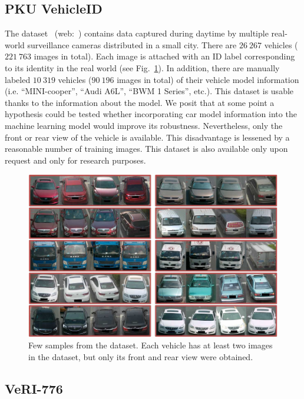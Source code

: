 \subsection{PKU VehicleID}
\label{ssec:DatasetPKUVehicleID}

The  dataset~\cite{liu2016deepreldist} (web:~\cite{webpkuvehicledataset}) contains data captured during daytime by multiple real-world surveillance cameras distributed in a small city. There are $26\ 267$ vehicles ($221\ 763$ images in total). Each image is attached with an ID label corresponding to its identity in the real world (see Fig.~\ref{fig:VehicleIDDataset}). In addition, there are manually labeled $10\ 319$ vehicles ($90\ 196$ images in total) of their vehicle model information (i.e. “MINI-cooper”, “Audi A6L”, “BWM 1 Series”, etc.). This dataset is usable thanks to the information about the model. We posit that at some point a hypothesis could be tested whether incorporating car model information into the machine learning model would improve its robustness. Nevertheless, only the front or rear view of the vehicle is available. This disadvantage is lessened by a reasonable number of training images. This dataset is also available only upon request and only for research purposes.

\begin{figure}[t]
    \centerline{\includegraphics[width=0.5\linewidth]{figures/datasets/vehicleid_overview.pdf}}
    \caption[ dataset]{Few samples from the  dataset. Each vehicle has at least two images in the dataset, but only its front and rear view were obtained. }
    \label{fig:VehicleIDDataset}
\end{figure}

\subsection{VeRI-776}
\label{ssec:DatasetVeRI776}


